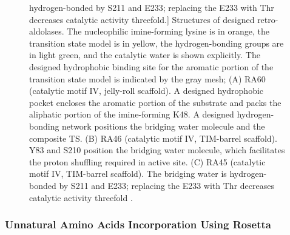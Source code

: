 \begin{refsection}
\begin{figure}[htbp]
        hydrogen-bonded by S211 and E233; replacing the E233 with Thr decreases
        catalytic activity threefold.] {Structures of designed retro-aldolases.
            The nucleophilic imine-forming lysine is in orange, the transition
            state model is in yellow, the hydrogen-bonding groups are in light
            green, and the catalytic water is shown explicitly.  The designed
            hydrophobic binding site for the aromatic portion of the transition
            state model is indicated by the gray mesh; (A) RA60 (catalytic
            motif IV, jelly-roll scaffold). A designed hydrophobic pocket
            encloses the aromatic portion of the substrate and packs the
            aliphatic portion of the imine-forming K48. A designed
            hydrogen-bonding network positions the bridging water molecule and
            the composite TS. (B) RA46 (catalytic motif IV, TIM-barrel
            scaffold). Y83 and S210 position the bridging water molecule, which
            facilitates the proton shuffling required in active site. (C) RA45
            (catalytic motif IV, TIM-barrel scaffold). The bridging water is
            hydrogen-bonded by S211 and E233; replacing the E233 with Thr
            decreases catalytic activity threefold \cite{Jiang2008}.}
        \label{fig:rosetta-enzyme} 
\end{figure}

\subsubsection{Unnatural Amino Acids Incorporation Using Rosetta}


\end{refsection}
